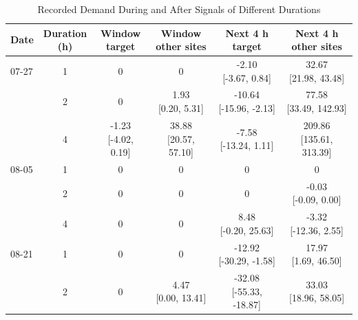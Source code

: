 \begin{table}[H]
\color{black}
\caption{Recorded Demand During and After Signals of Different Durations}
\label{tab:app-duration-energy}
\centering\footnotesize
\setlength{\tabcolsep}{2pt}
\renewcommand{\arraystretch}{1.12}
\begin{tabular*}{\columnwidth}{@{\extracolsep{\fill}}lccccc@{}}
\toprule
Date & \shortstack{Duration\\(h)} & \shortstack{Window\\target} & \shortstack{Window\\other sites} & \shortstack{Next 4 h\\target} & \shortstack{Next 4 h\\other sites}\\
\midrule
07-27 & 1 & 0 & 0 & \shortstack{-2.10\\{}[-3.67, 0.84]} & \shortstack{32.67\\{}[21.98, 43.48]}\\
 & 2 & 0 & \shortstack{1.93\\{}[0.20, 5.31]} & \shortstack{-10.64\\{}[-15.96, -2.13]} & \shortstack{77.58\\{}[33.49, 142.93]}\\
 & 4 & \shortstack{-1.23\\{}[-4.02, 0.19]} & \shortstack{38.88\\{}[20.57, 57.10]} & \shortstack{-7.58\\{}[-13.24, 1.11]} & \shortstack{209.86\\{}[135.61, 313.39]}\\
\midrule
08-05 & 1 & 0 & 0 & 0 & 0\\
 & 2 & 0 & 0 & 0 & \shortstack{-0.03\\{}[-0.09, 0.00]}\\
 & 4 & 0 & 0 & \shortstack{8.48\\{}[-0.20, 25.63]} & \shortstack{-3.32\\{}[-12.36, 2.55]}\\
\midrule
08-21 & 1 & 0 & 0 & \shortstack{-12.92\\{}[-30.29, -1.58]} & \shortstack{17.97\\{}[1.69, 46.50]}\\
 & 2 & 0 & \shortstack{4.47\\{}[0.00, 13.41]} & \shortstack{-32.08\\{}[-55.33, -18.87]} & \shortstack{33.03\\{}[18.96, 58.05]}\\

\end{tabular*}
\end{table}
